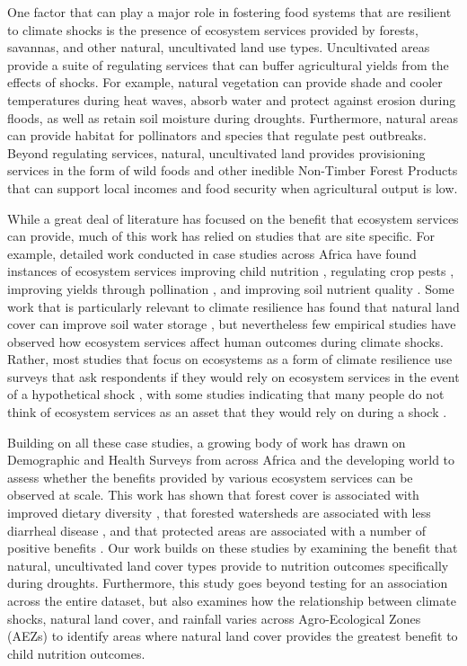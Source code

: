\documentclass{article}
\begin{document}
One factor that can play a major role in fostering food systems that are resilient to climate shocks is the presence of ecosystem services provided by forests, savannas, and other natural, uncultivated land use types.  Uncultivated areas provide a suite of regulating services that can buffer agricultural yields from the effects of shocks.  For example, natural vegetation can provide shade and cooler temperatures during heat waves, absorb water and protect against erosion during floods, as well as retain soil moisture during droughts.  Furthermore, natural areas can provide habitat for pollinators and species that regulate pest outbreaks.  Beyond regulating services, natural, uncultivated land provides provisioning services in the form of wild foods and other inedible Non-Timber Forest Products that can support local incomes and food security when agricultural output is low.

While a great deal of literature has focused on the benefit that ecosystem services can provide, much of this work has relied on studies that are site specific.  For example, detailed work conducted in case studies across Africa have found instances of ecosystem services improving child nutrition \cite{Golden2011}, regulating crop pests \cite{Girma2000}, improving yields through pollination \cite{Gemmill-Herren2008, Munyuli2012}, and improving soil nutrient quality \cite{Sileshi2012, Boffa2000, Siriri2009}.  Some work that is particularly relevant to climate resilience has found that natural land cover can improve soil water storage \cite{Siriri2013, Lott2009}, but nevertheless few empirical studies have observed how ecosystem services affect human outcomes during climate shocks.  Rather, most studies that focus on ecosystems as a form of climate resilience use surveys that ask respondents if they would rely on ecosystem services in the event of a hypothetical shock \cite{Robledo2012}, with some studies indicating that many people do not think of ecosystem services as an asset that they would rely on during a shock \cite{Wunder2014}.

Building on all these case studies, a growing body of work has drawn on Demographic and Health Surveys from across Africa and the developing world to assess whether the benefits provided by various ecosystem services can be observed at scale.  This work has shown that forest cover is associated with improved dietary diversity \cite{Ickowitz2014, Rasolofoson2018}, that forested watersheds are associated with less diarrheal disease \cite{Herrera2017}, and that protected areas are associated with a number of positive benefits \cite{naidoo2019evaluating}.  Our work builds on these studies by examining the benefit that natural, uncultivated land cover types provide to nutrition outcomes specifically during droughts.  Furthermore, this study goes beyond testing for an association across the entire dataset, but also examines how the relationship between climate shocks, natural land cover, and rainfall varies across Agro-Ecological Zones (AEZs) to identify areas where natural land cover provides the greatest benefit to child nutrition outcomes.
\end{document}
